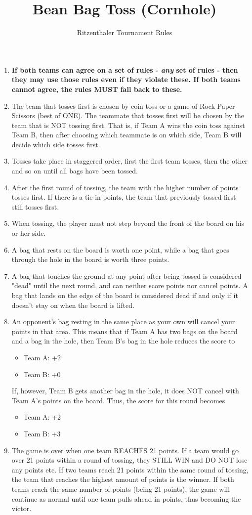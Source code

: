 \documentclass[a4paper]{article}
\title{Bean Bag Toss (Cornhole)}
\author{Ritzenthaler Tournament Rules}
\begin{document}
\maketitle
\begin{enumerate}
\item \textbf{If both teams can agree on a set of rules - \textit{any} set of rules - then they may use those rules even if they violate these. If both teams cannot agree, the rules MUST fall back to these.}
\item The team that tosses first is chosen by coin toss or a game of Rock-Paper-Scissors (best of ONE). The teammate that tosses first will be chosen by the team that is NOT tossing first. That is, if Team A wins the coin toss against Team B, then after choosing which teammate is on which side, Team B will decide which side tosses first.
\item Tosses take place in staggered order, first the first team tosses, then the other and so on until all bags have been tossed.
\item After the first round of tossing, the team with the higher number of points tosses first. If there is a tie in points, the team that previously tossed first still tosses first.
\item When tossing, the player must not step beyond the front of the board on his or her side.
\item A bag that rests on the board is worth one point, while a bag that goes through the hole in the board is worth three points.
\item A bag that touches the ground at any point after being tossed is considered "dead" until the next round, and can neither score points nor cancel points. A bag that lands on the edge of the board is considered dead if and only if it doesn't stay on when the board is lifted.
\item An opponent's bag resting in the same place as your own will cancel your points in that area. This means that if Team A has two bags on the board and a bag in the hole, then Team B's bag in the hole reduces the score to
\begin{itemize}
\item Team A: +2
\item Team B: +0
\end{itemize}
If, however, Team B gets another bag in the hole, it does NOT cancel with Team A's points on the board. Thus, the score for this round becomes
\begin{itemize}
\item Team A: +2
\item Team B: +3
\end{itemize}
\item The game is over when one team REACHES 21 points. If a team would go over 21 points within a round of tossing, they STILL WIN and DO NOT lose any points etc. If two teams reach 21 points within the same round of tossing, the team that reaches the highest amount of points is the winner. If both teams reach the same number of points (being 21 points), the game will continue as normal until one team pulls ahead in points, thus becoming the victor.
\end{enumerate}
\end{document}
